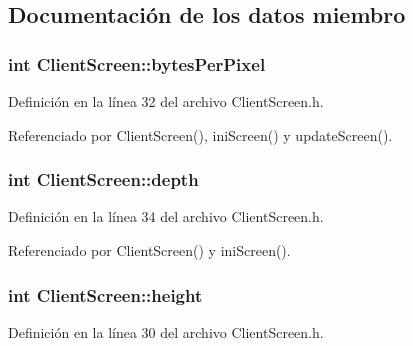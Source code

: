 \subsection{Documentación de los datos miembro}
\hypertarget{classClientScreen_a76eeef3335185b032cf23820a423b094}{
\subsubsection[{bytes\-Per\-Pixel}]{\setlength{\rightskip}{0pt plus 5cm}int Client\-Screen\-::bytes\-Per\-Pixel\hspace{0.3cm}{\ttfamily [private]}}}\label{classClientScreen_a76eeef3335185b032cf23820a423b094}


Definición en la línea 32 del archivo Client\-Screen.\-h.



Referenciado por Client\-Screen(), ini\-Screen() y update\-Screen().

\hypertarget{classClientScreen_ab56f74d3f4375a74a8275c61a128910d}{
\subsubsection[{depth}]{\setlength{\rightskip}{0pt plus 5cm}int Client\-Screen\-::depth\hspace{0.3cm}{\ttfamily [private]}}}\label{classClientScreen_ab56f74d3f4375a74a8275c61a128910d}


Definición en la línea 34 del archivo Client\-Screen.\-h.



Referenciado por Client\-Screen() y ini\-Screen().

\hypertarget{classClientScreen_ad6ead1ee3668a762e8fe2a0912ed282c}{
\subsubsection[{height}]{\setlength{\rightskip}{0pt plus 5cm}int Client\-Screen\-::height\hspace{0.3cm}{\ttfamily [private]}}}\label{classClientScreen_ad6ead1ee3668a762e8fe2a0912ed282c}


Definición en la línea 30 del archivo Client\-Screen.\-h.



